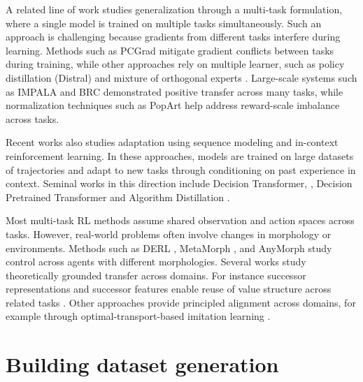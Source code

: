 \documentclass[10pt]{article} %
\begin{document}
\begin{itemize}
A related line of work studies generalization through a multi-task formulation, where a single model is trained on multiple tasks simultaneously. Such an approach is challenging because gradients from different tasks interfere during learning. Methods such as PCGrad \citep{yu2020} mitigate gradient conflicts between tasks during training, while other approaches rely on multiple learner, such as policy distillation (Distral) \citep{teh2017} and mixture of orthogonal experts \citep{hendawy2024}. Large-scale systems such as IMPALA \citep{espeholt2018} and BRC \citep{nauman2025} demonstrated positive transfer across many tasks, while normalization techniques such as PopArt help address reward-scale imbalance across tasks\citep{hessel2018}.

Recent works also studies adaptation using sequence modeling and in-context reinforcement learning. In these approaches, models are trained on large datasets of trajectories and adapt to new tasks through conditioning on past experience in context. Seminal works in this direction include Decision Transformer,  \citep{chen2021}, Decision Pretrained Transformer \cite{lee2023} and Algorithm Distillation \citep{laskin2022}.

Most multi-task RL methods assume shared observation and action spaces across tasks. However, real-world problems often involve changes in morphology or environments. Methods such as DERL \citep{gupta2021}, MetaMorph \citep{gupta2022}, and AnyMorph \citep{trabucco2022} study control across agents with different morphologies. Several works study theoretically grounded transfer across domains. For instance successor representations and successor features enable reuse of value structure across related tasks \citep{Barreto2017,dayan1993}. Other approaches provide principled alignment across domains, for example through optimal-transport-based imitation learning \citep{fickinger2022}. 

\section{Building dataset generation}
\label{apx:building_dataset_generation}


\end{itemize}
\end{document}
